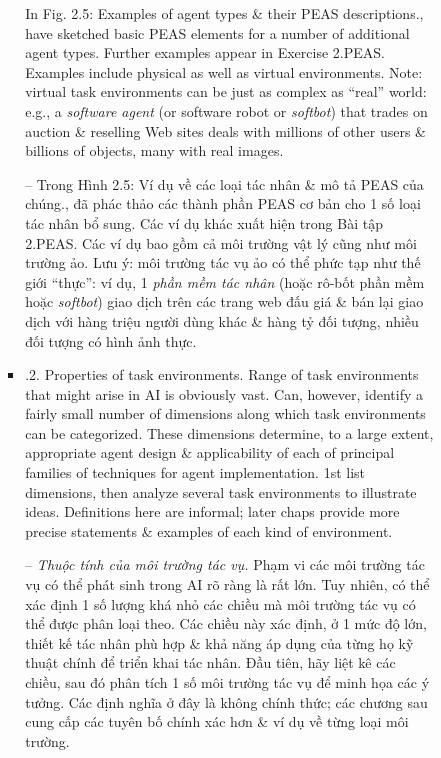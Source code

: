 \documentclass{article}
\begin{document}
\begin{itemize}
\begin{itemize}
\begin{itemize}
\begin{itemize}
				In {\sf Fig. 2.5: Examples of agent types \& their PEAS descriptions.}, have sketched basic PEAS elements for a number of additional agent types. Further examples appear in Exercise 2.PEAS. Examples include physical as well as virtual environments. Note: virtual task environments can be just as complex as ``real'' world: e.g., a {\it software agent} (or software robot or {\it softbot}) that trades on auction \& reselling Web sites deals with millions of other users \& billions of objects, many with real images.
				
				-- Trong {\sf Hình 2.5: Ví dụ về các loại tác nhân \& mô tả PEAS của chúng.}, đã phác thảo các thành phần PEAS cơ bản cho 1 số loại tác nhân bổ sung. Các ví dụ khác xuất hiện trong Bài tập 2.PEAS. Các ví dụ bao gồm cả môi trường vật lý cũng như môi trường ảo. Lưu ý: môi trường tác vụ ảo có thể phức tạp như thế giới ``thực'': ví dụ, 1 {\it phần mềm tác nhân} (hoặc rô-bốt phần mềm hoặc {\it softbot}) giao dịch trên các trang web đấu giá \& bán lại giao dịch với hàng triệu người dùng khác \& hàng tỷ đối tượng, nhiều đối tượng có hình ảnh thực.				
				\item {.2. Properties of task environments.} Range of task environments that might arise in AI is obviously vast. Can, however, identify a fairly small number of dimensions along which task environments can be categorized. These dimensions determine, to a large extent, appropriate agent design \& applicability of each of principal families of techniques for agent implementation. 1st list dimensions, then analyze several task environments to illustrate ideas. Definitions here are informal; later chaps provide more precise statements \& examples of each kind of environment.
				
				-- {\it Thuộc tính của môi trường tác vụ.} Phạm vi các môi trường tác vụ có thể phát sinh trong AI rõ ràng là rất lớn. Tuy nhiên, có thể xác định 1 số lượng khá nhỏ các chiều mà môi trường tác vụ có thể được phân loại theo. Các chiều này xác định, ở 1 mức độ lớn, thiết kế tác nhân phù hợp \& khả năng áp dụng của từng họ kỹ thuật chính để triển khai tác nhân. Đầu tiên, hãy liệt kê các chiều, sau đó phân tích 1 số môi trường tác vụ để minh họa các ý tưởng. Các định nghĩa ở đây là không chính thức; các chương sau cung cấp các tuyên bố chính xác hơn \& ví dụ về từng loại môi trường.
				

\end{itemize}
\end{itemize}
\end{itemize}
\end{itemize}
\end{document}
